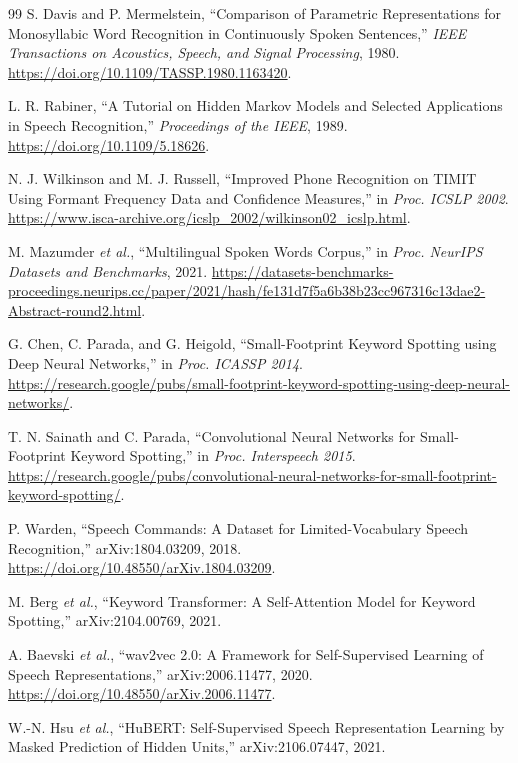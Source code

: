 \documentclass[11pt,a4paper]{article}
\begin{document}
\begin{thebibliography}{99}
S. Davis and P. Mermelstein, ``Comparison of Parametric Representations for Monosyllabic Word Recognition in Continuously Spoken Sentences,'' \textit{IEEE Transactions on Acoustics, Speech, and Signal Processing}, 1980. \url{https://doi.org/10.1109/TASSP.1980.1163420}.

L. R. Rabiner, ``A Tutorial on Hidden Markov Models and Selected Applications in Speech Recognition,'' \textit{Proceedings of the IEEE}, 1989. \url{https://doi.org/10.1109/5.18626}.

N. J. Wilkinson and M. J. Russell, ``Improved Phone Recognition on TIMIT Using Formant Frequency Data and Confidence Measures,'' in \textit{Proc. ICSLP 2002}. \url{https://www.isca-archive.org/icslp_2002/wilkinson02_icslp.html}.

M. Mazumder \textit{et al.}, ``Multilingual Spoken Words Corpus,'' in \textit{Proc. NeurIPS Datasets and Benchmarks}, 2021. \url{https://datasets-benchmarks-proceedings.neurips.cc/paper/2021/hash/fe131d7f5a6b38b23cc967316c13dae2-Abstract-round2.html}.

G. Chen, C. Parada, and G. Heigold, ``Small-Footprint Keyword Spotting using Deep Neural Networks,'' in \textit{Proc. ICASSP 2014}. \url{https://research.google/pubs/small-footprint-keyword-spotting-using-deep-neural-networks/}.

T. N. Sainath and C. Parada, ``Convolutional Neural Networks for Small-Footprint Keyword Spotting,'' in \textit{Proc. Interspeech 2015}. \url{https://research.google/pubs/convolutional-neural-networks-for-small-footprint-keyword-spotting/}.

P. Warden, ``Speech Commands: A Dataset for Limited-Vocabulary Speech Recognition,'' arXiv:1804.03209, 2018. \url{https://doi.org/10.48550/arXiv.1804.03209}.

M. Berg \textit{et al.}, ``Keyword Transformer: A Self-Attention Model for Keyword Spotting,'' arXiv:2104.00769, 2021.

A. Baevski \textit{et al.}, ``wav2vec 2.0: A Framework for Self-Supervised Learning of Speech Representations,'' arXiv:2006.11477, 2020. \url{https://doi.org/10.48550/arXiv.2006.11477}.

W.-N. Hsu \textit{et al.}, ``HuBERT: Self-Supervised Speech Representation Learning by Masked Prediction of Hidden Units,'' arXiv:2106.07447, 2021.


\end{thebibliography}
\end{document}
